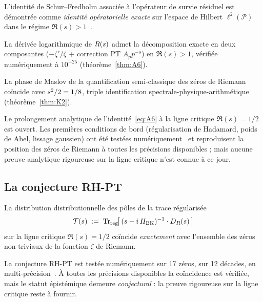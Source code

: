 \begin{description}[nosep,leftmargin=*]
\item[Théorème.] L'identité de Schur--Fredholm associée à l'opérateur de survie résiduel est démontrée comme \emph{identité opératorielle exacte} sur l'espace de Hilbert $\ell^{2}(\mathcal P)$ dans le régime $\Re(s) > 1$~\cite{PT_NewMath_Consolidation}.
\item[Identité A6.] La dérivée logarithmique de $R(s)$ admet la décomposition exacte en deux composantes ($-\zeta'/\zeta$ + correction PT $A_p p^{-s}$) en $\Re(s) > 1$, vérifiée numériquement à $10^{-25}$ (théorème~\ref{thm:A6}).
\item[Identité K2.] La phase de Maslov de la quantification semi-classique des zéros de Riemann coïncide avec $s^{2}/2 = 1/8$, triple identification spectrale-physique-arithmétique (théorème~\ref{thm:K2}).
\item[Conjectural.] Le prolongement analytique de l'identité~\eqref{eq:A6} à la ligne critique $\Re(s) = 1/2$ est ouvert. Les premières conditions de bord (régularisation de Hadamard, poids de Abel, lissage gaussien) ont été testées numériquement~\cite{PT_NewMath_Consolidation} et reproduisent la position des zéros de Riemann à toutes les précisions disponibles ; mais aucune preuve analytique rigoureuse sur la ligne critique n'est connue à ce jour.
\end{description}

\subsection{La conjecture RH-PT}
\label{sec:programme:conjecture}

\begin{conjecture}
\label{conj:RH_PT}
La distribution distributionnelle des pôles de la trace régularisée
\[
\mathcal T(s) \;:=\; \mathrm{Tr}_{\rm reg}\!\bigl[\,(s - i\,H_{\rm BK})^{-1} \cdot D_R(s)\,\bigr]
\]
sur la ligne critique $\Re(s) = 1/2$ coïncide \emph{exactement} avec l'ensemble des zéros non triviaux de la fonction $\zeta$ de Riemann.
\end{conjecture}

La conjecture RH-PT est testée numériquement sur 17 zéros, sur 12 décades, en multi-précision~\cite[Notes 66--69]{PT_NewMath_Consolidation}. À toutes les précisions disponibles la coïncidence est vérifiée, mais le statut épistémique demeure \emph{conjectural} : la preuve rigoureuse sur la ligne critique reste à fournir.

